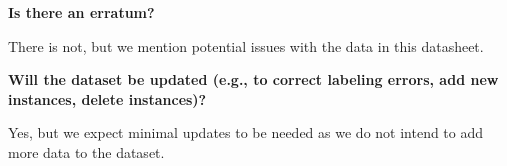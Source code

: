 

\textbf{Is there an erratum?}

There is not, but we mention potential issues with the data in this datasheet.

\textbf{Will the dataset be updated (e.g., to correct labeling errors, add
new instances, delete instances)?}

Yes, but we expect minimal updates to be needed as we do not intend to add more data to the dataset.

